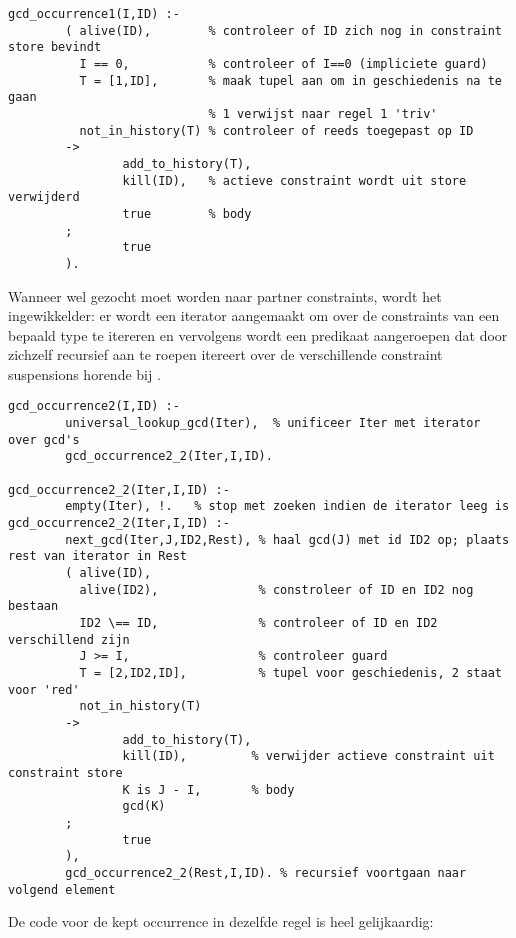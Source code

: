 {\scriptsize \begin{Verbatim}[frame=single]
gcd_occurrence1(I,ID) :-
        ( alive(ID),        % controleer of ID zich nog in constraint store bevindt
          I == 0,           % controleer of I==0 (impliciete guard)
          T = [1,ID],       % maak tupel aan om in geschiedenis na te gaan
                            % 1 verwijst naar regel 1 'triv'
          not_in_history(T) % controleer of reeds toegepast op ID
        ->
                add_to_history(T),
                kill(ID),   % actieve constraint wordt uit store verwijderd
                true        % body
        ;
                true
        ).
\end{Verbatim}
}

Wanneer wel gezocht moet worden naar partner constraints, wordt het ingewikkelder: er wordt een iterator aangemaakt om over de constraints van een bepaald type te itereren en vervolgens wordt een predikaat aangeroepen dat door zichzelf recursief aan te roepen itereert over de verschillende constraint suspensions horende bij .

{\scriptsize \begin{Verbatim}[frame=single]
gcd_occurrence2(I,ID) :-
        universal_lookup_gcd(Iter),  % unificeer Iter met iterator over gcd's
        gcd_occurrence2_2(Iter,I,ID).

gcd_occurrence2_2(Iter,I,ID) :-
        empty(Iter), !.   % stop met zoeken indien de iterator leeg is
gcd_occurrence2_2(Iter,I,ID) :-
        next_gcd(Iter,J,ID2,Rest), % haal gcd(J) met id ID2 op; plaats rest van iterator in Rest
        ( alive(ID),
          alive(ID2),              % constroleer of ID en ID2 nog bestaan
          ID2 \== ID,              % controleer of ID en ID2 verschillend zijn
          J >= I,                  % controleer guard
          T = [2,ID2,ID],          % tupel voor geschiedenis, 2 staat voor 'red'
          not_in_history(T)
        ->
                add_to_history(T),
                kill(ID),         % verwijder actieve constraint uit constraint store
                K is J - I,       % body
                gcd(K)
        ;
                true
        ),
        gcd_occurrence2_2(Rest,I,ID). % recursief voortgaan naar volgend element
\end{Verbatim}
}

De code voor de kept occurrence in dezelfde regel is heel gelijkaardig:

